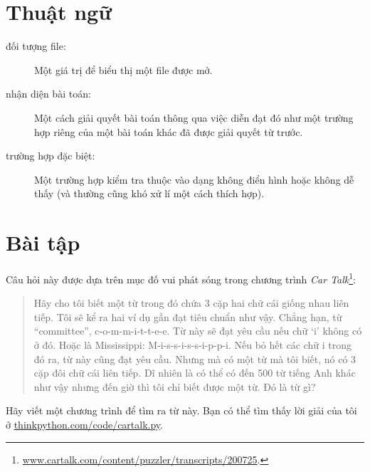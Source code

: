 \documentclass[11pt]{book}
\begin{document}


\section{Thuật ngữ}
\begin{description}

\item[đối tượng file:]  Một giá trị để biểu thị một file được mở.

\item[nhận diện bài toán:] Một cách giải quyết bài toán thông qua
việc diễn đạt đó như một trường hợp riêng của một bài toán khác đã
được giải quyết từ trước.

\item[trường hợp đặc biệt:] Một trường hợp kiểm tra thuộc vào dạng
không điển hình hoặc không dễ thấy (và thường cũng khó xử lí một cách
thích hợp).

\end{description}


\section{Bài tập}

\begin{ex}


Câu hỏi này được dựa trên mục đố vui phát sóng trong chương trình {\em Car
  Talk}\footnote{\url{www.cartalk.com/content/puzzler/transcripts/200725}.}:

\begin{quote}
Hãy cho tôi biết một từ trong đó chứa 3 cặp hai chữ cái giống nhau
liên tiếp. Tôi sẽ kể ra hai ví dụ gần đạt tiêu chuẩn như vậy. Chẳng hạn,
từ ``committee'', c-o-m-m-i-t-t-e-e. Từ này sẽ đạt yêu cầu nếu chữ `i' 
không có ở đó. Hoặc là Mississippi: M-i-s-s-i-s-s-i-p-p-i. Nếu bỏ hết các
chữ i trong đó ra, từ này cũng đạt yêu cầu. Nhưng mà có một từ mà tôi biết,
nó có 3 cặp đôi chữ cái liên tiếp. Dĩ nhiên là có thể có đến 500 từ tiếng
Anh khác như vậy nhưng đến giờ thì tôi chỉ biết được một từ. Đó là từ gì?
\end{quote}

Hãy viết một chương trình để tìm ra từ này. Bạn có thể tìm thấy lời giải 
của tôi ở \url{thinkpython.com/code/cartalk.py}.

\end{ex}
\end{document}
